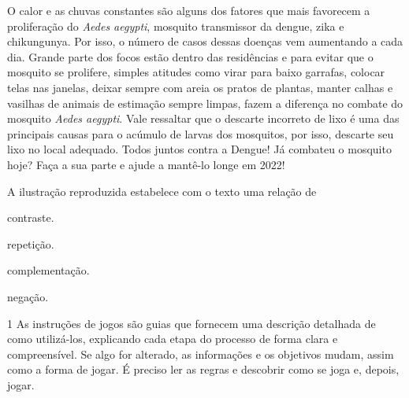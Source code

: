 \begin{myquote}
O calor e as chuvas constantes são alguns dos fatores que mais
favorecem a proliferação do \textit{Aedes aegypti}, mosquito transmissor da
dengue, zika e chikungunya. Por isso, o número de casos dessas doenças
vem aumentando a cada dia. Grande parte dos focos estão dentro das
residências e para evitar que o mosquito se prolifere, simples atitudes
como virar para baixo garrafas, colocar telas nas janelas, deixar sempre
com areia os pratos de plantas, manter calhas e vasilhas de animais de
estimação sempre limpas, fazem a diferença no combate do mosquito 
\textit{Aedes aegypti}. Vale ressaltar que o descarte incorreto de 
lixo é uma das principais causas para o acúmulo de larvas dos mosquitos,
por isso, descarte seu lixo no local adequado. Todos juntos contra a
Dengue! Já combateu o mosquito hoje? Faça a sua parte e ajude a mantê-lo
longe em 2022!

\end{myquote}

A ilustração reproduzida  estabelece com o texto uma relação de

\begin{escolha}

  \item contraste.

  \item repetição.

  \item complementação.

  \item negação.

\end{escolha}
\pagebreak

\vspace*{-3.4cm}
\pagebreak

\num{1} As instruções de jogos são guias que fornecem uma descrição 
detalhada de como utilizá-los, explicando cada etapa do processo de 
forma clara e compreensível. Se algo for alterado, as informações 
e os objetivos mudam, assim como a forma de jogar. É preciso ler 
as regras e descobrir como se joga e, depois, jogar.

